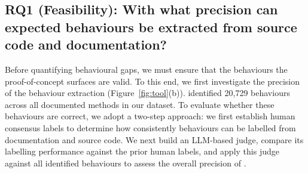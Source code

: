 \subsection{RQ1 (Feasibility): With what precision can expected behaviours be extracted from source code and documentation?}
\label{sec:rq1}


Before quantifying behavioural gaps, we must ensure that the behaviours the \toolname{} proof-of-concept surfaces are valid. 
To this end, we first investigate the precision of the \toolname{} behaviour extraction (Figure~\ref{fig:tool}(b)). 
\toolname{} identified 20,729 behaviours across all documented methods in our dataset.
To evaluate whether these behaviours are correct, 
we adopt a two-step approach: we first establish human consensus labels to determine how consistently behaviours can be labelled from documentation and source code.
We next build an LLM-based judge, compare its labelling performance against the prior human labels, and apply this judge against all identified behaviours to assess the overall precision of \toolname{}.

